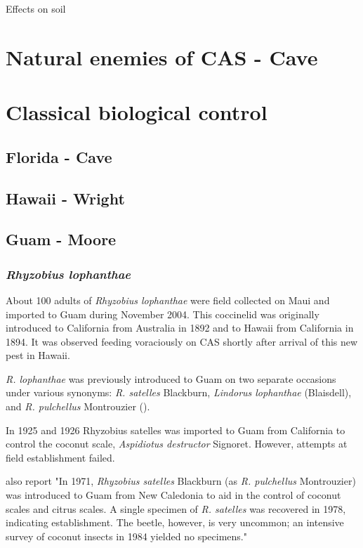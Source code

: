\documentclass[12pt,letterpaper,english,bibliography=totocnumbered, abstract=on]{scrartcl}
\begin{document}
Effects on soil \cite{marlerTwoCycadSpecies2020}


\cite{haynesExoticInvasivePest2005}



\section{Natural enemies of CAS - Cave}

\section{Classical biological control}

\subsection{Florida - Cave}

\subsection{Hawaii - Wright}

\subsection{Guam - Moore}

\subsubsection{\textit{Rhyzobius lophanthae}}

About 100 adults of \textit{Rhyzobius lophanthae} were field collected on Maui and imported to Guam during November 2004. This coccinelid was originally 
introduced to California from Australia in 1892 and to Hawaii from California in 1894. It was observed feeding voraciously on CAS shortly after arrival of this new pest in Hawaii. 

\textit{R. lophanthae} was previously introduced to Guam on two separate occasions under various synonyms: \textit{R. satelles} Blackburn, \textit{Lindorus lophanthae} (Blaisdell), and \textit{R. pulchellus} Montrouzier (\cite{nafus_biological_1989}). 

In 1925 and 1926 Rhyzobius satelles was imported to Guam from California to control the coconut scale, \textit{Aspidiotus destructor} Signoret. However, attempts at field establishment failed.  

\cite{nafus_biological_1989} also report "In 1971, \textit{Rhyzobius satelles} Blackburn (as \textit{R. pulchellus} Montrouzier) was introduced to Guam from New Caledonia to aid in the control of coconut scales and citrus scales. A single specimen of \textit{R. satelles} was recovered in 1978, indicating establishment. The beetle, however, is very uncommon; an intensive survey of coconut insects in 1984 yielded no specimens."
\end{document}
